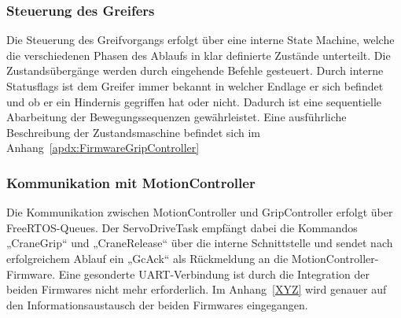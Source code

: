 \documentclass[main.tex]{subfiles} %
\begin{document}
\subsubsection{Steuerung des Greifers}
Die Steuerung des Greifvorgangs erfolgt über eine interne State Machine, welche die verschiedenen Phasen des
Ablaufs in klar definierte Zustände unterteilt. Die Zustandsübergänge werden durch eingehende Befehle gesteuert.
Durch interne Statusflags ist dem Greifer immer bekannt in welcher Endlage er sich befindet und ob er ein Hindernis
gegriffen hat oder nicht. Dadurch ist eine sequentielle Abarbeitung der Bewegungssequenzen gewährleistet. Eine
ausführliche Beschreibung der Zustandsmaschine befindet sich im Anhang~\ref{apdx:FirmwareGripController}



\subsubsection{Kommunikation mit MotionController}
Die Kommunikation zwischen MotionController und GripController erfolgt über FreeRTOS-Queues. Der ServoDriveTask empfängt
dabei die Kommandos „CraneGrip“ und „CraneRelease“ über die interne Schnittstelle und sendet nach erfolgreichem Ablauf ein
„GcAck“ als Rückmeldung an die MotionController-Firmware. Eine gesonderte UART-Verbindung ist durch die Integration der
beiden Firmwares nicht mehr erforderlich. Im Anhang~\ref{XYZ} wird genauer auf den Informationsaustausch der beiden Firmwares
eingegangen.
\end{document}
